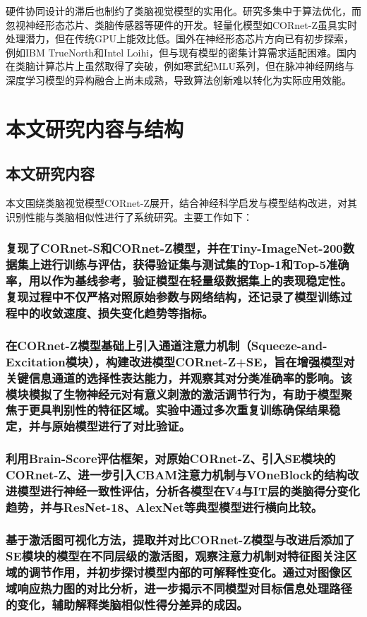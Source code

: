 硬件协同设计的滞后也制约了类脑视觉模型的实用化。研究多集中于算法优化，而忽视神经形态芯片、类脑传感器等硬件的开发。轻量化模型如CORnet-Z虽具实时处理潜力，但在传统GPU上能效比低。国外在神经形态芯片方向已有初步探索，例如IBM TrueNorth和Intel Loihi，但与现有模型的密集计算需求适配困难。国内在类脑计算芯片上虽然取得了突破，例如寒武纪MLU系列，但在脉冲神经网络与深度学习模型的异构融合上尚未成熟，导致算法创新难以转化为实际应用效能。


\section{本文研究内容与结构}

\subsection{本文研究内容}

本文围绕类脑视觉模型CORnet-Z展开，结合神经科学启发与模型结构改进，对其识别性能与类脑相似性进行了系统研究。主要工作如下：

\subsubsection{复现了CORnet-S和CORnet-Z模型，并在Tiny-ImageNet-200数据集上进行训练与评估，获得验证集与测试集的Top-1和Top-5准确率，用以作为基线参考，验证模型在轻量级数据集上的表现稳定性。复现过程中不仅严格对照原始参数与网络结构，还记录了模型训练过程中的收敛速度、损失变化趋势等指标。}

\subsubsection{在CORnet-Z模型基础上引入通道注意力机制（Squeeze-and-Excitation模块），构建改进模型CORnet-Z+SE，旨在增强模型对关键信息通道的选择性表达能力，并观察其对分类准确率的影响。该模块模拟了生物神经元对有意义刺激的激活调节行为，有助于模型聚焦于更具判别性的特征区域。实验中通过多次重复训练确保结果稳定，并与原始模型进行了对比验证。}

\subsubsection{利用Brain-Score评估框架，对原始CORnet-Z、引入SE模块的CORnet-Z、进一步引入CBAM注意力机制与VOneBlock的结构改进模型进行神经一致性评估，分析各模型在V4与IT层的类脑得分变化趋势，并与ResNet-18、AlexNet等典型模型进行横向比较。}

\subsubsection{基于激活图可视化方法，提取并对比CORnet-Z模型与改进后添加了SE模块的模型在不同层级的激活图，观察注意力机制对特征图关注区域的调节作用，并初步探讨模型内部的可解释性变化。通过对图像区域响应热力图的对比分析，进一步揭示不同模型对目标信息处理路径的变化，辅助解释类脑相似性得分差异的成因。}

